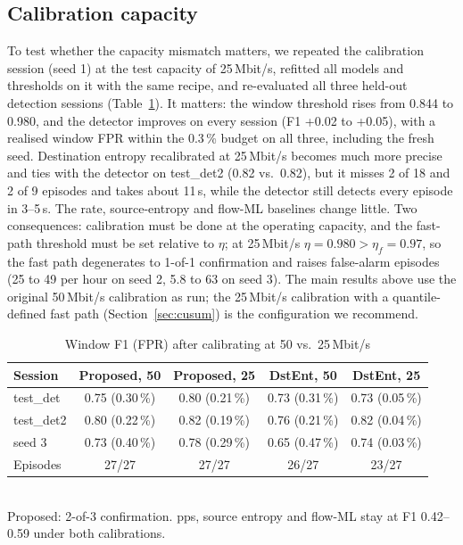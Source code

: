 \documentclass[conference]{IEEEtran}
\begin{document}
\subsection{Calibration capacity}\label{sec:cap}
To test whether the capacity mismatch matters, we repeated the calibration session (seed 1) at the test capacity of 25\,Mbit/s, refitted all models and thresholds on it with the same recipe, and re-evaluated all three held-out detection sessions (Table~\ref{tab:cap}). It matters: the window threshold rises from 0.844 to 0.980, and the detector improves on every session (F1 +0.02 to +0.05), with a realised window FPR within the 0.3\,\% budget on all three, including the fresh seed. Destination entropy recalibrated at 25\,Mbit/s becomes much more precise and ties with the detector on test\_det2 (0.82 vs.\ 0.82), but it misses 2 of 18 and 2 of 9 episodes and takes about 11\,s, while the detector still detects every episode in 3--5\,s. The rate, source-entropy and flow-ML baselines change little. Two consequences: calibration must be done at the operating capacity, and the fast-path threshold must be set relative to $\eta$; at 25\,Mbit/s $\eta=0.980>\eta_f=0.97$, so the fast path degenerates to 1-of-1 confirmation and raises false-alarm episodes (25 to 49 per hour on seed 2, 5.8 to 63 on seed 3). The main results above use the original 50\,Mbit/s calibration as run; the 25\,Mbit/s calibration with a quantile-defined fast path (Section~\ref{sec:cusum}) is the configuration we recommend.

\begin{table}[t]
\caption{Window F1 (FPR) after calibrating at 50 vs.\ 25\,Mbit/s}
\label{tab:cap}
\centering
\footnotesize
\setlength{\tabcolsep}{2.4pt}
\begin{tabular}{lcccc}
\toprule
Session & Proposed, 50 & Proposed, 25 & DstEnt, 50 & DstEnt, 25 \\
\midrule
test\_det & 0.75 (0.30\,\%) & 0.80 (0.21\,\%) & 0.73 (0.31\,\%) & 0.73 (0.05\,\%) \\
test\_det2 & 0.80 (0.22\,\%) & 0.82 (0.19\,\%) & 0.76 (0.21\,\%) & 0.82 (0.04\,\%) \\
seed 3 & 0.73 (0.40\,\%) & 0.78 (0.29\,\%) & 0.65 (0.47\,\%) & 0.74 (0.03\,\%) \\
\midrule
Episodes & 27/27 & 27/27 & 26/27 & 23/27 \\
\bottomrule
\end{tabular}\\[2pt]
\footnotesize Proposed: 2-of-3 confirmation. pps, source entropy and flow-ML stay at F1 0.42--0.59 under both calibrations.
\end{table}
\end{document}
